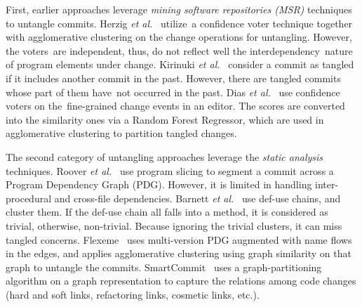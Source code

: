First, earlier approaches leverage {\em mining software repositories
  (MSR)} techniques to untangle commits. Herzig {\em et
  al.}~\cite{kim-msr13,kim-emse16} utilize~a confidence voter
technique together with agglomerative clustering on the change
operations for untangling.
However, the voters~are independent, thus, do not reflect well the
interdependency~nature of program elements under change.
%
Kirinuki {\em et al.}~\cite{higo-apsec16, higo-icpc14} consider a
commit as tangled if it includes another commit in the past. However,
there are tangled commits whose part of them have~not occurred
in the past.
%
Dias {\em et al.}~\cite{dias-saner15} use confidence voters
on the~fine-grained change events in an editor. The scores are converted
into the similarity ones via a Random Forest Regressor, which are used
in agglomerative clustering to partition tangled changes.

The second category of untangling approaches leverage the {\em static
  analysis} techniques. Roover {\em et al.}~\cite{roover-scam18} use
program slicing to segment a commit across a Program Dependency Graph
(PDG).  However, it is limited in handling inter-procedural and
cross-file dependencies. Barnett {\em et al.}~\cite{barnett-icse15}
use def-use chains, and cluster them. If the def-use chain all falls
into a method, it is considered as trivial, otherwise,
non-trivial. Because ignoring the trivial clusters, it can miss tangled
concerns. Flexeme~\cite{flexeme-fse20} uses multi-version PDG
augmented with name flows in the edges, and applies agglomerative
clustering using graph similarity on that graph to untangle the
commits. SmartCommit~\cite{smartcommit-fse21} uses a
graph-partitioning algorithm on a graph representation to capture the
relations among code changes (hard and soft links, refactoring links,
cosmetic links, etc.).


